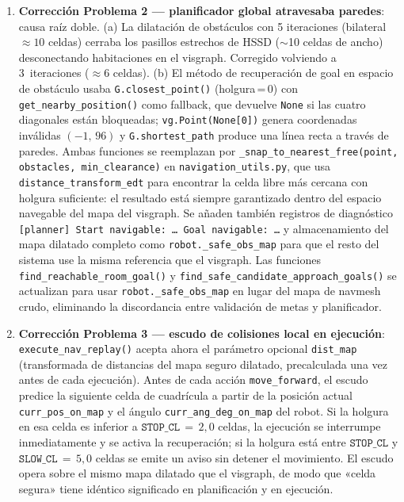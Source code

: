 \documentclass[11pt,a4paper]{article}
\begin{document}
\begin{enumerate}
  \item \textbf{Corrección Problema 2 — planificador global atravesaba paredes}:
        causa raíz doble. (a) La dilatación de obstáculos con 5 iteraciones (bilateral
        $\approx10$ celdas) cerraba los pasillos estrechos de HSSD ($\sim$10 celdas de
        ancho) desconectando habitaciones en el visgraph. Corregido volviendo a
        3~iteraciones ($\approx6$ celdas). (b) El método de recuperación de goal en
        espacio de obstáculo usaba \texttt{G.closest\_point()} (holgura\,=\,0) con
        \texttt{get\_nearby\_position()} como fallback, que devuelve \texttt{None} si
        las cuatro diagonales están bloqueadas; \texttt{vg.Point(None[0])} genera
        coordenadas inválidas $(-1,\,96)$ y \texttt{G.shortest\_path} produce una línea
        recta a través de paredes. Ambas funciones se reemplazan por
        \texttt{\_snap\_to\_nearest\_free(point, obstacles, min\_clearance)} en
        \texttt{navigation\_utils.py}, que usa \texttt{distance\_transform\_edt} para
        encontrar la celda libre más cercana con holgura suficiente: el resultado está
        siempre garantizado dentro del espacio navegable del mapa del visgraph.
        Se añaden también registros de diagnóstico \texttt{[planner] Start navigable:
        \ldots{} Goal navigable: \ldots{}} y almacenamiento del mapa dilatado completo
        como \texttt{robot.\_safe\_obs\_map} para que el resto del sistema use la misma
        referencia que el visgraph. Las funciones
        \texttt{find\_reachable\_room\_goal()} y
        \texttt{find\_safe\_candidate\_approach\_goals()} se actualizan para usar
        \texttt{robot.\_safe\_obs\_map} en lugar del mapa de navmesh crudo, eliminando
        la discordancia entre validación de metas y planificador.

  \item \textbf{Corrección Problema 3 — escudo de colisiones local en ejecución}:
        \texttt{execute\_nav\_replay()} acepta ahora el parámetro opcional
        \texttt{dist\_map} (transformada de distancias del mapa seguro dilatado,
        precalculada una vez antes de cada ejecución). Antes de cada acción
        \texttt{move\_forward}, el escudo predice la siguiente celda de cuadrícula a
        partir de la posición actual \texttt{curr\_pos\_on\_map} y el ángulo
        \texttt{curr\_ang\_deg\_on\_map} del robot. Si la holgura en esa celda es
        inferior a $\texttt{STOP\_CL}\,{=}\,2{,}0$ celdas, la ejecución se interrumpe
        inmediatamente y se activa la recuperación; si la holgura está entre
        $\texttt{STOP\_CL}$ y $\texttt{SLOW\_CL}\,{=}\,5{,}0$ celdas se emite un aviso
        sin detener el movimiento. El escudo opera sobre el mismo mapa dilatado que el
        visgraph, de modo que «celda segura» tiene idéntico significado en planificación
        y en ejecución.


\end{enumerate}
\end{document}

